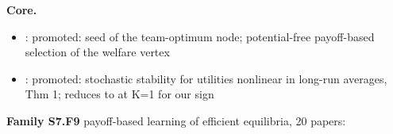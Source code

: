 \documentclass[10pt]{article}
\newcommand{\memb}[1]{\par\smallskip\textbf{#1}\quad}
\begin{document}
\memb{Core.}
\begin{itemize}[nosep,leftmargin=1.2em]
\item \citet{Marden-achieving14}: promoted: seed of the team-optimum node; potential-free payoff-based selection of the welfare vertex
\item \citet{Ramakrishnan-completely16}: promoted: stochastic stability for utilities nonlinear in long-run averages, Thm 1; reduces to \citet{Marden-achieving14} at K=1 for our sign
\end{itemize}
\memb{Family S7.F9} payoff-based learning of efficient equilibria, 20 papers: {\footnotesize \citetext{\citealp{Marden-achieving14}; \citealp{Ramakrishnan-completely16}; \citealp{PradelskiYoung-learning12}; \citealp{Ramakrishnan-completely19}; \citealp{Donmez-logitq25}; \citealp{Kiremitci-decentralized26}; \citealp{ArieliBabichenko-average12}; \citealp{Chasparis-aspiration13}; \citealp{Menon-convergence13}\dag; \citealp{MenonBaras-distributed13}\dag; \citealp{MenonBaras-collaborative14}\dag; \citealp{Borowski-learning15}; \citealp{Marden-selecting17}\dag; \citealp{Borowski-learning18}; \citealp{Gaveau-performance20}; \citealp{BistritzLeshem-game21}; \citealp{Yongacoglu-decentralized22}; \citealp{Kiremitci-achieving25}; \citealp{Taupin-improved25}; \citealp{Kiremitci-decentralized26b}}}
\end{document}

